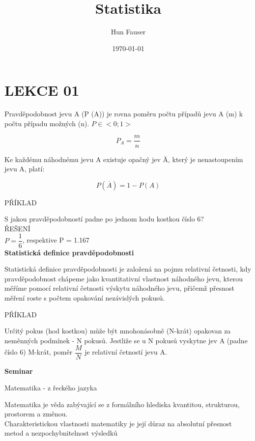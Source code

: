 \documentclass[a4paper,12pt]{article}
\title{Statistika}
\author{Hun Fauser}
\date{\today}
\begin{document}

\maketitle

\section{LEKCE 01}

Pravděpodobnost jevu A (P (A)) je rovna poměru počtu případů jevu A (m) 
k počtu případu možných (n). $P\in<0;1>$

\[  P_{A} = \frac{m}{n} \]

Ke každému náhodnému jevu A existuje opačný jev \={A}, který je nenastoupením jevu A, platí:

\[  P (\overline{A}) = 1 - P(A) \]

PŘÍKLAD

S jakou pravděpodobností padne po jednom hodu kostkou číslo 6? \\

ŘEŠENÍ \\

$P = \dfrac{1}{6}$, respektive P = 1.167 \\

\Large \textbf{Statistická definice pravděpodobnosti}

\normalsize
Statistická definice pravděpodobnosti je založená na pojmu relativní četnosti, 
kdy pravděpodobnost chápeme jako kvantitativní vlastnost náhodného jevu, 
kterou měříme pomocí relativní četnosti výskytu náhodného jevu, přičemž 
přesnost měření roste s počtem opakování nezávislých pokusů.

PŘÍKLAD

Určitý pokus (hod kostkou) může být mnohonásobně (N-krát) opakovan 
za neměnných podmínek - N pokusů. Jestliže se u N pokusů vyskytne jev A (padne číslo 6)
M-krát, poměr $\dfrac{M}{N}$ je relativní četností jevu A.

\newpage
\Large \textbf{Seminar}

\normalsize
Matematika - z řeckého jazyka

Matematika je věda zabývající se z formálního hlediska kvantitou, 
strukturou, prostorem a změnou. \\

Charakteristickou vlastnosti matematiky je její důraz 
na absolutní přesnost metod a nezpochybnitelnost výsledků \\
\end{document}
